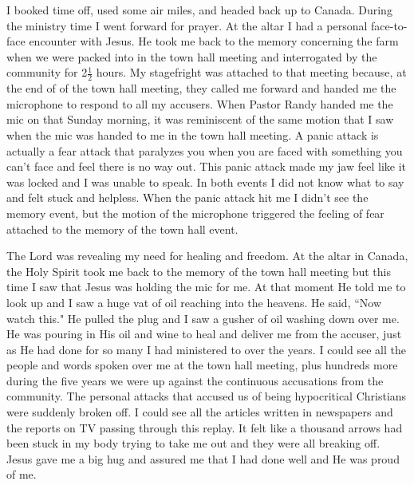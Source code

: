 \documentclass[oneside,12pt]{book}
\begin{document}
I booked time off, used some air miles, and headed back up to Canada. During the ministry time I went forward for prayer. At the altar I had a personal face-to-face encounter with Jesus. He took me back to the memory concerning the farm when we were packed into in the town hall meeting and interrogated by the community for 2$\frac{1}{2}$ hours. My stagefright was attached to that meeting because, at the end of of the town hall meeting, they called me forward and handed me the microphone to respond to all my accusers. When Pastor Randy handed me the mic on that Sunday morning, it was reminiscent of the same motion that I saw when the mic was handed to me in the town hall meeting. A panic attack is actually a fear attack that paralyzes you when you are faced with something you can't face and feel there is no way out. This panic attack made my jaw feel like it was locked and I was unable to speak. In both events I did not know what to say and felt stuck and helpless. When the panic attack hit me I didn't see the memory event, but the motion of the microphone triggered the feeling of fear attached to the memory of the town hall event. 

The Lord was revealing my need for healing and freedom. At the altar in Canada, the Holy Spirit took me back to the memory of the town hall meeting but this time I saw that Jesus was holding the mic for me. At that moment He told me to look up and I saw a huge vat of oil reaching into the heavens. He said, ``Now watch this." He pulled the plug and I saw a gusher of oil washing down over me. He was pouring in His oil and wine to heal and deliver me from the accuser, just as He had done for so many I had ministered to over the years. I could see all the people and words spoken over me at the town hall meeting, plus hundreds more during the five years we were up against the continuous accusations from the community. The personal attacks that accused us of being hypocritical Christians were suddenly broken off. I could see all the articles written in newspapers and the reports on TV passing through this replay. It felt like a thousand arrows had been stuck in my body trying to take me out and they were all breaking off. Jesus gave me a big hug and assured me that I had done well and He was proud of me. 
\end{document}
